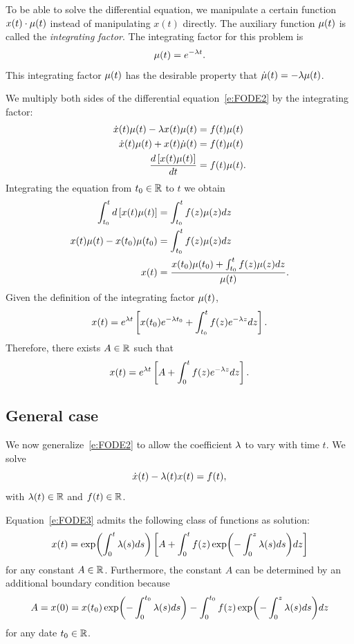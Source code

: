 \documentclass[letterpaper, 11pt, leqno]{article}
\begin{document}
To be able to solve the differential equation, we manipulate a certain function $x(t)\cdot \mu(t)$ instead of manipulating $x(t)$ directly. The auxiliary function $\mu(t) $ is called the \textit{integrating factor}. The integrating factor for this problem is 
\begin{equation*}
\mu(t) =e^{-\lambda t}.
\end{equation*}
This integrating factor $\mu(t)$ has the desirable property that $\dot{\mu}(t) =-\lambda \mu(t)$.

We multiply both sides of the differential equation~\eqref{e:FODE2} by the integrating factor:
\begin{align*}
\dot{x}(t) \m(t) -\l x(t) \m(t) & =f(t) \m(t)\\
\dot{x}(t) \m(t) +x(t) \dot{\m}(t) &=f(t) \m(t)\\
\od{\bs{x(t) \m(t)}}{t}& =f(t) \m(t).
\end{align*}
Integrating the equation from $t_{0}\in \mathbb{R}$ to $t$ we obtain
\begin{align}
\int_{t_{0}}^{t} d\left[ x(t) \mu(t) \right]&=\int_{t_{0}}^{t}f(z) \mu(z) dz\nonumber\\
x(t)\mu(t)-x(t_{0})\mu(t_{0})&=\int_{t_{0}}^{t}f(z) \mu(z) dz\nonumber\\
x(t)& =\frac{x(t_{0}) \mu(t_{0})+\int_{t_{0}}^{t}f(z) \mu(z) dz}{\mu(t)}.\label{e:INTER}
\end{align}
Given the definition of the integrating factor $\mu(t)$, 
\begin{equation*}
x(t) = e^{\lambda t} \left[ x(t_{0}) e^{-\lambda t_{0}}+\int_{t_{0}}^{t}f(z) e^{-\lambda z} dz \right].
\end{equation*}
Therefore, there exists $A\in \mathbb{R}$ such that 
\begin{equation*}
x(t) = e^{\lambda t} \left[ A+\int_{0}^{t}f(z) e^{-\lambda z} dz \right].
\end{equation*}

\subsection{General case}

We now generalize~\eqref{e:FODE2} to allow the coefficient $\lambda$ to vary with time $t$. We solve
\begin{equation}
\dot{x}(t) -\lambda(t) x(t) =f(t),\label{e:FODE3}
\end{equation}
with $\lambda(t)\in \mathbb{R}$ and $f(t)\in \mathbb{R}$. 

Equation~\eqref{e:FODE3} admits the following class of functions as solution:
\begin{equation}
x(t)=\exp{\int_{0}^{t}\l(s) ds} \bs{A+\int_{0}^{t}f(z) \exp{-\int_{0}^{z}\l(s)ds} dz} \label{e:FODE3sol}
\end{equation}
for any constant $A\in \mathbb{R}$. Furthermore, the constant $A$ can be determined by an additional boundary condition because
\begin{equation*}
A=x(0)=x(t_{0}) \exp{-\int_{0}^{t_{0}}\l(s)ds}-\int_{0}^{t_{0}}f(z) \exp{-\int_{0}^{z}\l(s)ds} dz
\end{equation*}
for any date $t_{0}\in \mathbb{R}$.
\end{document}
